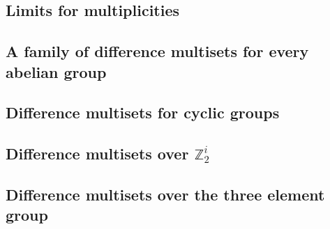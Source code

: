 \subsection{Limits for multiplicities}


\subsection{A family of difference multisets for every abelian group}
\label{sec:uni}


\subsection{Difference multisets for cyclic groups}


\subsection{Difference multisets over $\mathbb Z_2^i$}
\label{sec:z2i}


\subsection{Difference multisets over the three element group}
\label{sec:z3}

